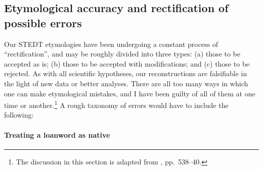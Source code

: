 


	
	
%



	
\subsection[Etymological accuracy and rectification of possible errors]{Etymological accuracy and rectification of possible errors}

Our STEDT etymologies have been undergoing a constant process of “rectification”, and may be roughly divided into three types: (a) those to be accepted as is; (b) those to be accepted with modifications; and (c) those to be rejected. 
As with all scientific hypotheses, our reconstructions are falsifiable in the light of new data or better analyses. 
There are all too many ways in which one can make etymological mistakes, and
I have been guilty of all of them at one time or another.\footnote{The discussion in this section is adapted from \textit{}, pp.~538–40.} 
A rough taxonomy of
errors would have to include the following:


\paragraph{Treating a loanword as native}

